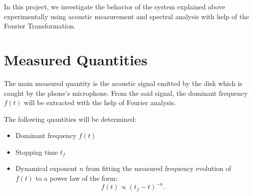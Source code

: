 In this project, we investigate the behavior of the system explained above experimentally using acoustic measurement and spectral analysis with help of the Fourier Transformation.


\section{Measured Quantities}

The main measured quantity is the acoustic signal emitted by the disk which is caught by the phone's microphone. From the said signal, the dominant frequency $f(t)$ will be extracted with the help of Fourier analysis.

The following quantities will be determined:

\begin{itemize}
    \item Dominant frequency $f(t)$
    \item Stopping time $t_f$
    \item Dynamical exponent $n$ from fitting the measured frequency evolution of $f(t)$ to a power law of the form:
    \begin{equation}
        f(t) \propto (t_f - t)^{-n}.
    \end{equation}
\end{itemize}

